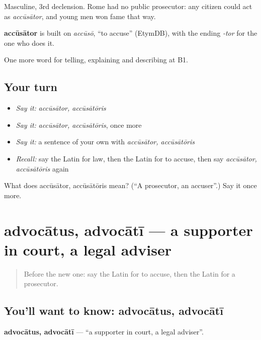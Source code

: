 Masculine, 3rd declension. Rome had no public prosecutor: any citizen could act as \emph{accūsātor}, and young men won fame that way.

\begin{cousinweb}
\textbf{accūsātor} is built on \emph{accūsō}, \textquotedblleft{}to accuse\textquotedblright{} (EtymDB), with the ending \emph{-tor} for the one who does it.
\end{cousinweb}

\begin{grammarlens}[title={What you've built}]
One more word for telling, explaining and describing at B1.
\end{grammarlens}

\subsection*{Your turn}
\begin{itemize}
\raggedright
  \item \emph{Say it:} \emph{accūsātor, accūsātōris}
  \item \emph{Say it:} \emph{accūsātor, accūsātōris}, once more
  \item \emph{Say it:} a sentence of your own with \emph{accūsātor, accūsātōris}
  \item \emph{Recall:} say the Latin for law, then the Latin for to accuse, then say \emph{accūsātor, accūsātōris} again
\end{itemize}

\begin{tcolorbox}[breakable,colback=teal!4,colframe=teal!35!black,title={Before you move on}]
What does accūsātor, accūsātōris mean? (\textquotedblleft{}A prosecutor, an accuser\textquotedblright{}.) Say it once more.
\end{tcolorbox}
\section[advocātus, advocātī]{advocātus, advocātī — a supporter in court, a legal adviser}

\label{lesson:LA-C309-advocatus}



\begin{quote}
Before the new one: say the Latin for to accuse, then the Latin for a prosecutor.
\end{quote}

\subsection*{You'll want to know: advocātus, advocātī}
\textbf{advocātus, advocātī} — \textquotedblleft{}a supporter in court, a legal adviser\textquotedblright{}.

